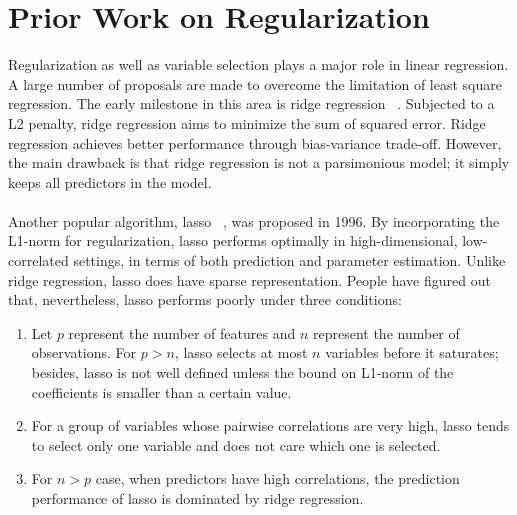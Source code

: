 \documentclass[11pt]{article}
\begin{document}
\section{Prior Work on Regularization}

Regularization as well as variable selection plays a major role in linear regression. A large number of proposals are made to overcome the limitation of least square regression. The early milestone in this area is ridge regression ~\cite{AEHoerl1970ridge}. Subjected to a L2 penalty, ridge regression aims to minimize the sum of squared error. Ridge regression achieves better performance through bias-variance trade-off. However, the main drawback is that ridge regression is not a parsimonious model; it simply keeps all predictors in the model. 
\\ \\
Another popular algorithm, lasso ~\cite{tibshirani1996regression}, was proposed in 1996. By incorporating the L1-norm for regularization, lasso performs optimally in high-dimensional, low-correlated settings, in terms of both prediction and parameter estimation. Unlike ridge regression, lasso does have sparse representation. People have figured out that, nevertheless, lasso performs poorly under three conditions:

\begin{enumerate} 

\item

Let $p$ represent the number of features and $n$ represent the number of observations. For $p>n$, lasso selects at most $n$ variables before it saturates; besides, lasso is not well defined unless the bound on L1-norm of the coefficients is smaller than a certain value.
\item

For a group of variables whose pairwise correlations are very high, lasso tends to select only one variable and does not care which one is selected.

\item

 For $n>p$ case, when predictors have high correlations, the prediction performance of lasso is dominated by ridge regression.\\ \\

\end{enumerate}
\end{document}
